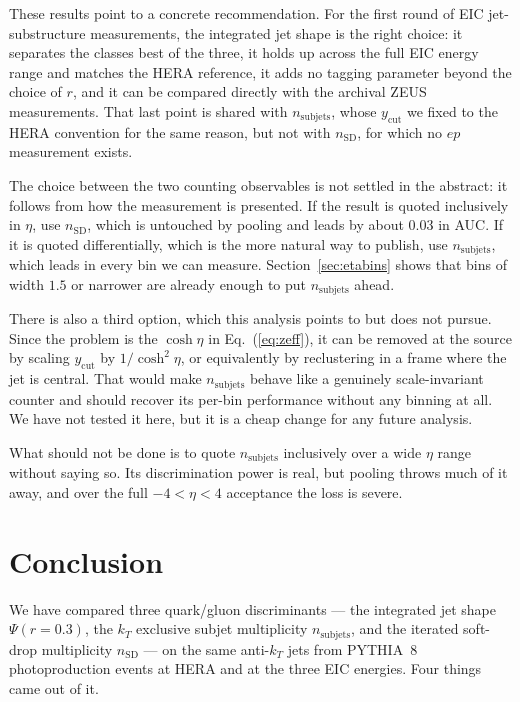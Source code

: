 \documentclass[reprint,amsmath,amssymb,aps,prd,floatfix]{revtex4-2}
\begin{document}
These results point to a concrete recommendation. For the first round of EIC
jet-substructure measurements, the integrated jet shape is the right choice: it
separates the classes best of the three, it holds up across the full EIC energy
range and matches the HERA reference, it adds no tagging parameter beyond the
choice of $r$, and it can be compared directly with the archival ZEUS
measurements. That last point is shared with $n_{\mathrm{subjets}}$, whose
$y_{\mathrm{cut}}$ we fixed to the HERA convention for the same reason, but not
with $n_{\mathrm{SD}}$, for which no $ep$ measurement exists.

The choice between the two counting observables is not settled in the abstract:
it follows from how the measurement is presented. If the result is quoted
inclusively in $\eta$, use $n_{\mathrm{SD}}$, which is untouched by pooling and
leads by about $0.03$ in AUC. If it is quoted differentially, which is the more
natural way to publish, use $n_{\mathrm{subjets}}$, which leads in every bin we
can measure. Section~\ref{sec:etabins} shows that bins of width $1.5$ or
narrower are already enough to put $n_{\mathrm{subjets}}$ ahead.

There is also a third option, which this analysis points to but does not pursue.
Since the problem is the $\cosh\eta$ in Eq.~(\ref{eq:zeff}), it can be removed
at the source by scaling $y_{\mathrm{cut}}$ by $1/\cosh^2\eta$, or equivalently
by reclustering in a frame where the jet is central. That would make
$n_{\mathrm{subjets}}$ behave like a genuinely scale-invariant counter and
should recover its per-bin performance without any binning at all. We have not
tested it here, but it is a cheap change for any future analysis.

What should not be done is to quote $n_{\mathrm{subjets}}$ inclusively over a
wide $\eta$ range without saying so. Its discrimination power is real, but
pooling throws much of it away, and over the full $-4 < \eta < 4$ acceptance the
loss is severe.

\section{Conclusion}\label{sec:conclusion}

We have compared three quark/gluon discriminants --- the integrated jet shape
$\Psi(r=0.3)$, the $k_T$ exclusive subjet multiplicity $n_{\mathrm{subjets}}$,
and the iterated soft-drop multiplicity $n_{\mathrm{SD}}$ --- on the same
anti-$k_T$ jets from PYTHIA~8 photoproduction events at HERA and at the three EIC
energies. Four things came out of it.
\end{document}
